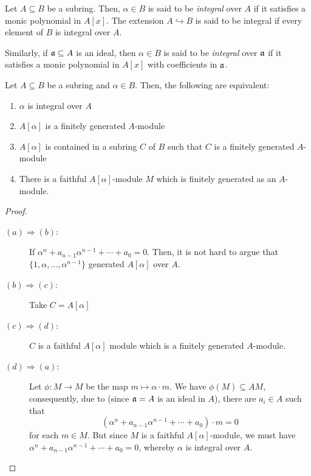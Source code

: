 \begin{definition}
    Let $A\subseteq B$ be a subring. Then, $\alpha\in B$ is said to be \textit{integral} over $A$ if it satisfies a monic polynomial in $A[x]$. The extension $A\hookrightarrow B$ is said to be integral if every element of $B$ is integral over $A$.

    Similarly, if $\mathfrak a\subseteq A$ is an ideal, then $\alpha\in B$ is said to be \textit{integral} over $\mathfrak a$ if it satisfies a monic polynomial in $A[x]$ with coefficients in $\mathfrak a$.
\end{definition}

\begin{theorem}
    Let $A\subseteq B$ be a subring and $\alpha\in B$. Then, the following are equivalent: 
    \begin{enumerate}[label=(\alph*)]
        \item $\alpha$ is integral over $A$
        \item $A[\alpha]$ is a finitely generated $A$-module 
        \item $A[\alpha]$ is contained in a subring $C$ of $B$ such that $C$ is a finitely generated $A$-module 
        \item There is a faithful $A[\alpha]$-module $M$ which is finitely generated as an $A$-module.
    \end{enumerate}
\end{theorem}
\begin{proof}
\begin{description}
    \item[$(a)\Longrightarrow(b)$:] If $\alpha^n + a_{n - 1}\alpha^{n - 1} + \cdots + a_0 = 0$. Then, it is not hard to argue that $\{1,\alpha,\ldots,\alpha^{n - 1}\}$ generated $A[\alpha]$ over $A$.
    \item[$(b)\Longrightarrow(c)$:] Take $C = A[\alpha]$ 
    \item[$(c)\Longrightarrow(d)$:] $C$ is a faithful $A[\alpha]$ module which is a finitely generated $A$-module.
    \item[$(d)\Longrightarrow(a)$:] Let $\phi: M\to M$ be the map $m\mapsto\alpha\cdot m$. We have $\phi(M)\subseteq AM$, consequently, due to  (since $\mathfrak a = A$ is an ideal in $A$), there are $a_i\in A$ such that 
    \begin{equation*}
        (\alpha^n + a_{n - 1}\alpha^{n - 1} + \cdots + a_0)\cdot m = 0
    \end{equation*}
    for each $m\in M$. But since $M$ is a faithful $A[\alpha]$-module, we must have $\alpha^{n} + a_{n - 1}\alpha^{n - 1} + \cdots + a_0 = 0$, whereby $\alpha$ is integral over $A$.\qedhere
\end{description}
\end{proof}

